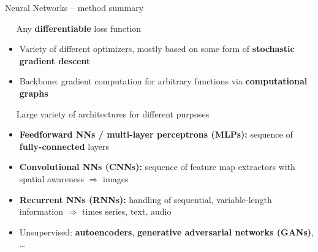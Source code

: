 
\begin{frame}{Neural Networks -- method summary}

\footnotesize

 ~~ Any \textbf{differentiable} loss function

\medskip


\begin{itemize}
  \item Variety of different optimizers, mostly based on some form of 
  \textbf{stochastic gradient descent}
  \item Backbone: gradient computation for arbitrary functions via 
  \textbf{computational graphs}
\end{itemize}

\medskip

 ~~ Large variety of architectures for different purposes
\begin{itemize}
  \item \textbf{Feedforward NNs / multi-layer perceptrons (MLPs):} sequence of 
  \textbf{fully-connected} layers
  \item \textbf{Convolutional NNs (CNNs):} sequence of feature map extractors 
  with spatial awareness $\Rightarrow$ images
  \item \textbf{Recurrent NNs (RNNs):} handling of sequential, variable-length 
  information $\Rightarrow$ times series, text, audio
  \item Unsupervised: \textbf{autoencoders}, \textbf{generative adversarial 
  networks (GANs)}, \dots
\end{itemize}



\end{frame}
